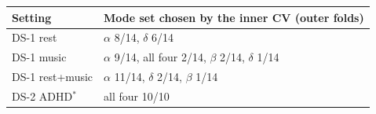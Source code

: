 \small
\begin{tabular}{lp{9cm}}
\hline
Setting & Mode set chosen by the inner CV (outer folds) \\
\hline
DS-1 rest & $\alpha$ 8/14, $\delta$ 6/14 \\
DS-1 music & $\alpha$ 9/14, all four 2/14, $\beta$ 2/14, $\delta$ 1/14 \\
DS-1 rest+music & $\alpha$ 11/14, $\delta$ 2/14, $\beta$ 1/14 \\
DS-2 ADHD$^\ast$ & all four 10/10 \\
\hline
\end{tabular}
